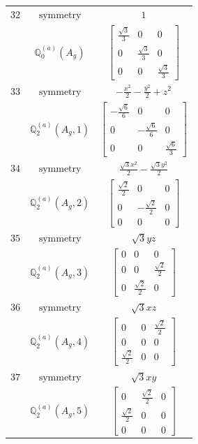 \documentclass[fleqn,8pt,landscape]{jsarticle}
\begin{document}
\begin{longtable}{ccc}
$ 32 $ & $ \text{symmetry} $ & $ 1 $ \\
$  $ & $ \mathbb{Q}_{0}^{(a)}(A_{g}) $ & $ \begin{bmatrix} \frac{\sqrt{3}}{3} & 0 & 0 \\ 0 & \frac{\sqrt{3}}{3} & 0 \\ 0 & 0 & \frac{\sqrt{3}}{3} \end{bmatrix} $ \\ \hline
$ 33 $ & $ \text{symmetry} $ & $ - \frac{x^{2}}{2} - \frac{y^{2}}{2} + z^{2} $ \\
$  $ & $ \mathbb{Q}_{2}^{(a)}(A_{g},1) $ & $ \begin{bmatrix} - \frac{\sqrt{6}}{6} & 0 & 0 \\ 0 & - \frac{\sqrt{6}}{6} & 0 \\ 0 & 0 & \frac{\sqrt{6}}{3} \end{bmatrix} $ \\ \hline
$ 34 $ & $ \text{symmetry} $ & $ \frac{\sqrt{3} x^{2}}{2} - \frac{\sqrt{3} y^{2}}{2} $ \\
$  $ & $ \mathbb{Q}_{2}^{(a)}(A_{g},2) $ & $ \begin{bmatrix} \frac{\sqrt{2}}{2} & 0 & 0 \\ 0 & - \frac{\sqrt{2}}{2} & 0 \\ 0 & 0 & 0 \end{bmatrix} $ \\ \hline
$ 35 $ & $ \text{symmetry} $ & $ \sqrt{3} y z $ \\
$  $ & $ \mathbb{Q}_{2}^{(a)}(A_{g},3) $ & $ \begin{bmatrix} 0 & 0 & 0 \\ 0 & 0 & \frac{\sqrt{2}}{2} \\ 0 & \frac{\sqrt{2}}{2} & 0 \end{bmatrix} $ \\ \hline
$ 36 $ & $ \text{symmetry} $ & $ \sqrt{3} x z $ \\
$  $ & $ \mathbb{Q}_{2}^{(a)}(A_{g},4) $ & $ \begin{bmatrix} 0 & 0 & \frac{\sqrt{2}}{2} \\ 0 & 0 & 0 \\ \frac{\sqrt{2}}{2} & 0 & 0 \end{bmatrix} $ \\ \hline
$ 37 $ & $ \text{symmetry} $ & $ \sqrt{3} x y $ \\
$  $ & $ \mathbb{Q}_{2}^{(a)}(A_{g},5) $ & $ \begin{bmatrix} 0 & \frac{\sqrt{2}}{2} & 0 \\ \frac{\sqrt{2}}{2} & 0 & 0 \\ 0 & 0 & 0 \end{bmatrix} $ \\ \hline

\end{longtable}
\end{document}
